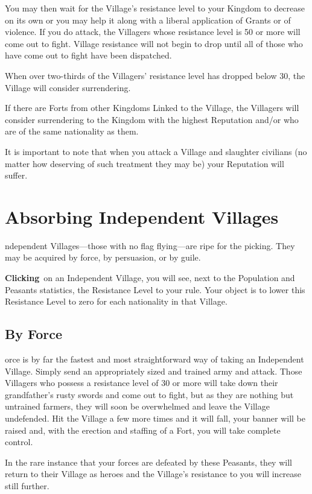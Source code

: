 You may then wait for the Village’s resistance level to your Kingdom to decrease on its own or you may help it along with a liberal application of Grants or of violence. If you do attack, the Villagers whose resistance level is 50 or more will come out to fight. Village resistance will not begin to drop until all of those who have come out to fight have been dispatched.

When over two-thirds of the Villagers’ resistance level has dropped below 30, the Village will consider surrendering.

If there are Forts from other Kingdoms Linked to the Village, the Villagers will consider surrendering to the Kingdom with the highest Reputation and/or who are of the same nationality as them.

It is important to note that when you attack a Village and slaughter civilians (no matter how deserving of such treatment they may be) your Reputation will suffer.

\section{Absorbing Independent Villages}

ndependent Villages---those with no flag flying---are ripe for the picking. They may be acquired by force, by persuasion, or by guile.

\textbf{Clicking} on an Independent Village, you will see, next to the Population and Peasants statistics, the Resistance Level to your rule. Your object is to lower this Resistance Level to zero for each nationality in that Village.

\subsection{By Force}

orce is by far the fastest and most straightforward way of taking an Independent Village. Simply send an appropriately sized and trained army and attack. Those Villagers who possess a resistance level of 30 or more will take down their grandfather’s rusty swords and come out to fight, but as they are nothing but untrained farmers, they will soon be overwhelmed and leave the Village undefended. Hit the Village a few more times and it will fall, your banner will be raised and, with the erection and staffing of a Fort, you will take complete control.

In the rare instance that your forces are defeated by these Peasants, they will return to their Village as heroes and the Village’s resistance to you will increase still further.


